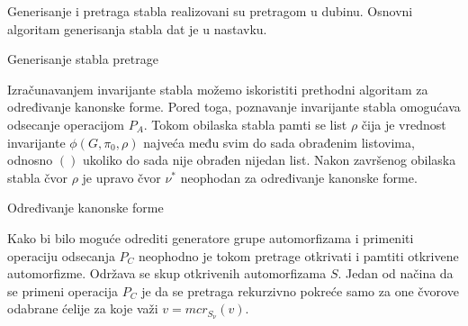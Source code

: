 \documentclass[12pt,oneside]{memoir}
\theoremstyle{definition}
\begin{document}
  Generisanje i pretraga stabla realizovani su pretragom u dubinu. Osnovni
  algoritam generisanja stabla dat je u nastavku.

  \begin{algorithm}[H]
	  \caption{Generisanje stabla pretrage}
	  \begin{algorithmic}[1]
		  \EndFor
		  \EndProcedure
	  \end{algorithmic}
  \end{algorithm}

  Izračunavanjem invarijante stabla možemo iskoristiti prethodni algoritam za
  određivanje kanonske forme. Pored toga, poznavanje invarijante stabla
  omogućava odsecanje operacijom $P_A$. Tokom obilaska stabla pamti se list
  $\rho$ čija je vrednost invarijante $\phi(G, \pi_0, \rho)$ najveća među svim
  do sada obrađenim listovima, odnosno $()$ ukoliko do sada nije obrađen
  nijedan list. Nakon završenog obilaska stabla čvor $\rho$ je upravo čvor
  $\nu^*$ neophodan za određivanje kanonske forme.

  \begin{algorithm}[H]
	  \caption{Određivanje kanonske forme}
	  \begin{algorithmic}[1]
		  	\State \Return
		  \EndIf
		  \EndFor
				\State {$\rho \gets \nu$}
			\EndIf
		  \EndIf
		  \EndProcedure
	  \end{algorithmic}
  \end{algorithm}

  Kako bi bilo moguće odrediti generatore grupe automorfizama i primeniti
  operaciju odsecanja $P_C$ neophodno je tokom pretrage otkrivati i pamtiti
  otkrivene automorfizme. Održava se skup otkrivenih automorfizama $S$. Jedan
  od načina da se primeni operacija $P_C$ je da se pretraga rekurzivno pokreće
  samo za one čvorove odabrane ćelije za koje važi $v = mcr_{S_\nu}(v)$.
\end{document}

